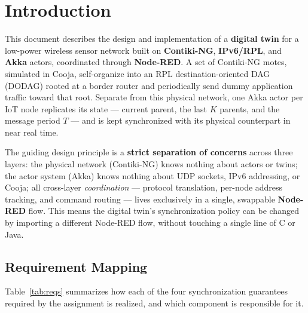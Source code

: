 \section{Introduction}

This document describes the design and implementation of a \textbf{digital twin} for a
low-power wireless sensor network built on \textbf{Contiki-NG}, \textbf{IPv6/RPL}, and
\textbf{Akka} actors, coordinated through \textbf{Node-RED}. A set of Contiki-NG motes,
simulated in Cooja, self-organize into an RPL destination-oriented DAG (DODAG) rooted at a
border router and periodically send dummy application traffic toward that root. Separate
from this physical network, one Akka actor per IoT node replicates its state --- current
parent, the last $K$ parents, and the message period $T$ --- and is kept synchronized with
its physical counterpart in near real time.

The guiding design principle is a \textbf{strict separation of concerns} across three
layers: the physical network (Contiki-NG) knows nothing about actors or twins; the actor
system (Akka) knows nothing about UDP sockets, IPv6 addressing, or Cooja; all
cross-layer \emph{coordination} --- protocol translation, per-node address tracking, and
command routing --- lives exclusively in a single, swappable \textbf{Node-RED} flow. This
means the digital twin's synchronization policy can be changed by importing a different
Node-RED flow, without touching a single line of C or Java.

\subsection*{Requirement Mapping}
Table~\ref{tab:reqs} summarizes how each of the four synchronization guarantees required by
the assignment is realized, and which component is responsible for it.

